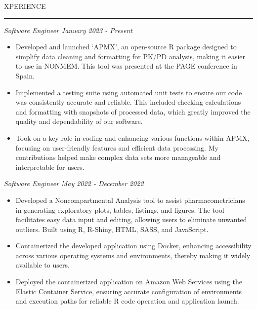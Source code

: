 \documentclass[11pt]{article}
\begin{document}
\par \scalebox{1.3}{E}XPERIENCE                    
\par \vspace{-0.1in} \noindent\rule{7.8in}{0.5pt} 
\textbf{\scalebox{1.2}{Amador Bioscience}} \hfill \scalebox{1.1}{Ann Arbor, Michigan}
\par \textit{Software Engineer} \hfill \textit{January 2023 - Present}
{\small
\begin{itemize}
    \item Developed and launched `APMX', an open-source R package designed to simplify data cleaning and formatting for PK/PD analysis, making it easier to use in NONMEM. This tool was presented at the PAGE conference in Spain.
    \item Implemented a testing suite using automated unit tests to ensure our code was consistently accurate and reliable. This included checking calculations and formatting with snapshots of processed data, which greatly improved the quality and dependability of our software.
    \item Took on a key role in coding and enhancing various functions within APMX, focusing on user-friendly features and efficient data processing. My contributions helped make complex data sets more manageable and interpretable for users.
\end{itemize}
}

\textbf{\scalebox{1.2}{Ann Arbor Pharmacometrics Group}} \hfill \scalebox{1.1}{Ann Arbor, Michigan}
\par \textit{Software Engineer} \hfill \textit{May 2022 - December 2022}
{
\small
\begin{itemize}
    \item Developed a Noncompartmental Analysis tool to assist pharmacometricians in generating exploratory plots, tables, listings, and figures. The tool facilitates easy data input and editing, allowing users to eliminate unwanted outliers. Built using R, R-Shiny, HTML, SASS, and JavaScript.
    \item Containerized the developed application using Docker, enhancing accessibility across various operating systems and environments, thereby making it widely available to users.
    \item Deployed the containerized application on Amazon Web Services using the Elastic Container Service, ensuring accurate configuration of environments and execution paths for reliable R code operation and application launch.
\end{itemize}
}
\end{document}
